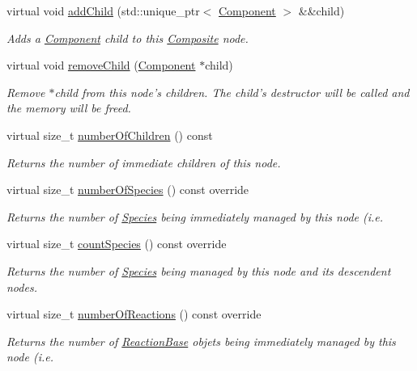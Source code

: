 \begin{DoxyCompactItemize}
virtual void \hyperlink{classchem_1_1Composite_a7f0737d480f68cb2e37eb061a1cfac36}{add\-Child} (std\-::unique\-\_\-ptr$<$ \hyperlink{classchem_1_1Component}{Component} $>$ \&\&child)
\begin{DoxyCompactList}\small\item\em Adds a \hyperlink{classchem_1_1Component}{Component} child to this \hyperlink{classchem_1_1Composite}{Composite} node. \end{DoxyCompactList}\item 
virtual void \hyperlink{classchem_1_1Composite_a1db2418dfbd583f05088fb4695fda677}{remove\-Child} (\hyperlink{classchem_1_1Component}{Component} $\ast$child)
\begin{DoxyCompactList}\small\item\em Remove $\ast$child from this node's children. The child's destructor will be called and the memory will be freed. \end{DoxyCompactList}\item 
virtual size\-\_\-t \hyperlink{classchem_1_1Composite_a89545dad587539c07acff13398e8ee7a}{number\-Of\-Children} () const 
\begin{DoxyCompactList}\small\item\em Returns the number of immediate children of this node. \end{DoxyCompactList}\item 
virtual size\-\_\-t \hyperlink{classchem_1_1Composite_a9f402bdea37c583b638a2ffdbd0d4bc9}{number\-Of\-Species} () const override
\begin{DoxyCompactList}\small\item\em Returns the number of \hyperlink{classchem_1_1Species}{Species} being immediately managed by this node (i.\-e. \end{DoxyCompactList}\item 
virtual size\-\_\-t \hyperlink{classchem_1_1Composite_adeea8db3d77911119e935afb679eeb9f}{count\-Species} () const override
\begin{DoxyCompactList}\small\item\em Returns the number of \hyperlink{classchem_1_1Species}{Species} being managed by this node and its descendent nodes. \end{DoxyCompactList}\item 
virtual size\-\_\-t \hyperlink{classchem_1_1Composite_a67ccb83464dc97ac82f3f1301f252931}{number\-Of\-Reactions} () const override
\begin{DoxyCompactList}\small\item\em Returns the number of \hyperlink{classchem_1_1ReactionBase}{Reaction\-Base} objets being immediately managed by this node (i.\-e. \end{DoxyCompactList}\item 

\end{DoxyCompactItemize}
